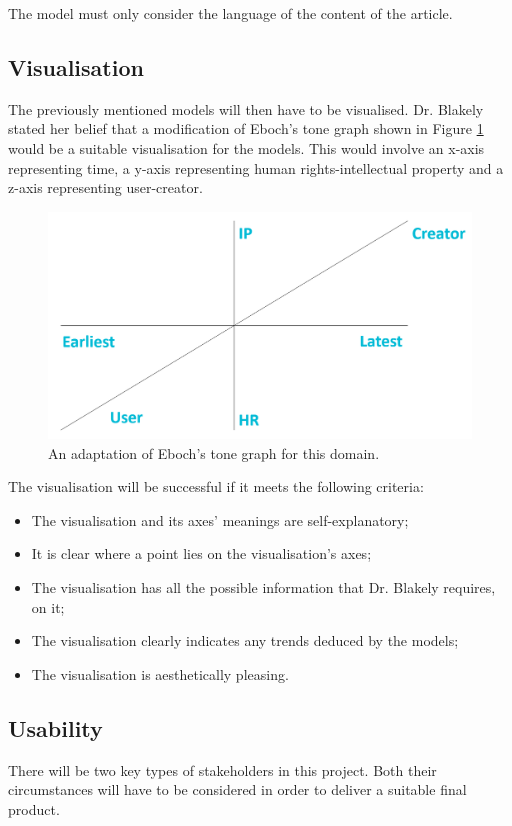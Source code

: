 			The model must only consider the language of the content of the article. 
		\subsection{Visualisation}
			The previously mentioned models will then have to be visualised. Dr. Blakely stated her belief that a modification of Eboch's tone graph\cite{tone_graph_eboch} shown in Figure \ref{fig:eboch_adapt} would be a suitable visualisation for the models. This would involve an x-axis representing time, a y-axis representing human rights-intellectual property and a z-axis representing user-creator. 
			
			\begin{figure}[h]
    			\centering
    			\includegraphics[width=0.5\linewidth]{resources/images/eboch_adapt.png}
    			\caption{An adaptation of Eboch's tone graph for this domain.}
    			\label{fig:eboch_adapt}
			\end{figure}
			
			The visualisation will be successful if it meets the following criteria:
			\begin{itemize}
				\item The visualisation and its axes' meanings are self-explanatory; 
    			\item It is clear where a point lies on the visualisation's axes; 
    			\item The visualisation has all the possible information that Dr. Blakely requires, on it; 
    			\item The visualisation clearly indicates any trends deduced by the models; 
    			\item The visualisation is aesthetically pleasing. 
			\end{itemize}
			
		\subsection{Usability}
			There will be two key types of stakeholders in this project. Both their circumstances will have to be considered in order to deliver a suitable final product. 

